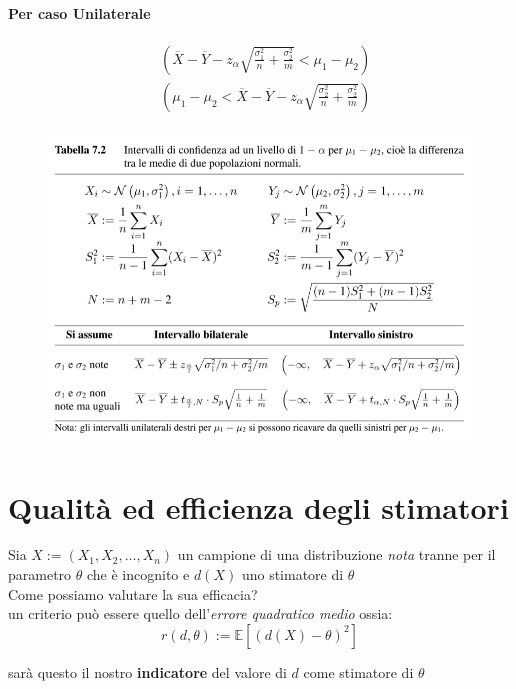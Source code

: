 \documentclass[]{article}
\newcommand{\ev}{\mathbb{E}[X]}
\renewcommand{\ev}[1]{\mathbb{E}\left[#1\right]}
\begin{document}
    \paragraph{Per caso Unilaterale}
    \begin{equation*}
        \begin{aligned}
            &\left( \overline{X} - \overline{Y} - z_{\alpha} \sqrt{\frac{\sigma^2_1}{n} + \frac{\sigma^2_2}{m}}< \mu_1 - \mu_2 \right) \\
            &\left( \mu_1 - \mu_2 < \overline{X} - \overline{Y} - z_{\alpha} \sqrt{\frac{\sigma^2_2}{n} + \frac{\sigma^2_2}{m}} \right) \\
           \end{aligned}
    \end{equation*}
    \begin{figure}[H]
        \includegraphics[width=\textwidth]{images/Screenshot_1.png}
    \end{figure}
    \newpage
    \section{Qualità ed efficienza degli stimatori}
    Sia $X := (X_1, X_2, \ldots, X_n)$ un campione di una distribuzione \textit{nota} tranne per il parametro $\theta$ che è incognito e $d(X)$ uno stimatore di $\theta$ \\
    Come possiamo valutare la sua efficacia? \\
    un criterio può essere quello dell'\textit{errore quadratico medio} ossia:
    \[ r(d, \theta) := \ev{(d(X) - \theta)^2} \]
    \centerline{sarà questo il nostro \textbf{indicatore} del valore di $d$ come stimatore di $\theta$}
\end{document}
